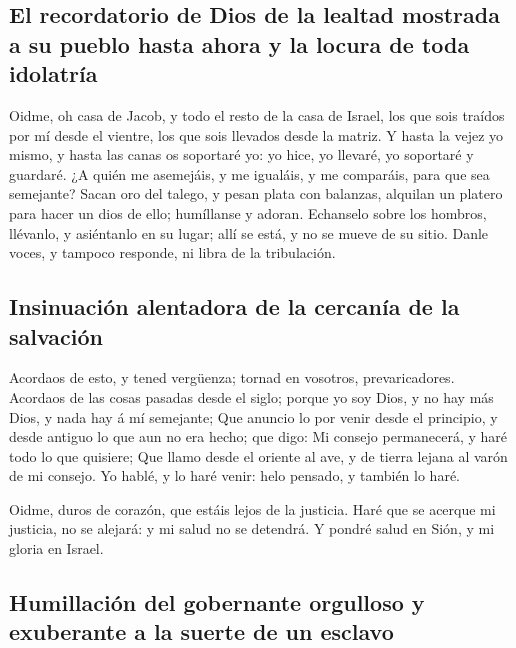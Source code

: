 \hypertarget{el-recordatorio-de-dios-de-la-lealtad-mostrada-a-su-pueblo-hasta-ahora-y-la-locura-de-toda-idolatruxeda}{%
\subsection{El recordatorio de Dios de la lealtad mostrada a su pueblo
hasta ahora y la locura de toda
idolatría}\label{el-recordatorio-de-dios-de-la-lealtad-mostrada-a-su-pueblo-hasta-ahora-y-la-locura-de-toda-idolatruxeda}}

 Oidme, oh casa de Jacob, y todo el resto de la casa de
Israel, los que sois traídos por mí desde el vientre, los que sois
llevados desde la matriz.  Y hasta la vejez yo mismo, y
hasta las canas os soportaré yo: yo hice, yo llevaré, yo soportaré y
guardaré.  ¿A quién me asemejáis, y me igualáis, y me
comparáis, para que sea semejante?  Sacan oro del talego,
y pesan plata con balanzas, alquilan un platero para hacer un dios de
ello; humíllanse y adoran.  Echanselo sobre los hombros,
llévanlo, y asiéntanlo en su lugar; allí se está, y no se mueve de su
sitio. Danle voces, y tampoco responde, ni libra de la tribulación.

\hypertarget{insinuaciuxf3n-alentadora-de-la-cercanuxeda-de-la-salvaciuxf3n}{%
\subsection{Insinuación alentadora de la cercanía de la
salvación}\label{insinuaciuxf3n-alentadora-de-la-cercanuxeda-de-la-salvaciuxf3n}}

 Acordaos de esto, y tened vergüenza; tornad en vosotros,
prevaricadores.  Acordaos de las cosas pasadas desde el
siglo; porque yo soy Dios, y no hay más Dios, y nada hay á mí semejante;
 Que anuncio lo por venir desde el principio, y desde
antiguo lo que aun no era hecho; que digo: Mi consejo permanecerá, y
haré todo lo que quisiere;  Que llamo desde el oriente al
ave, y de tierra lejana al varón de mi consejo. Yo hablé, y lo haré
venir: helo pensado, y también lo haré.

 Oidme, duros de corazón, que estáis lejos de la
justicia.  Haré que se acerque mi justicia, no se
alejará: y mi salud no se detendrá. Y pondré salud en Sión, y mi gloria
en Israel.

\hypertarget{humillaciuxf3n-del-gobernante-orgulloso-y-exuberante-a-la-suerte-de-un-esclavo}{%
\subsection{Humillación del gobernante orgulloso y exuberante a la
suerte de un
esclavo}\label{humillaciuxf3n-del-gobernante-orgulloso-y-exuberante-a-la-suerte-de-un-esclavo}}

